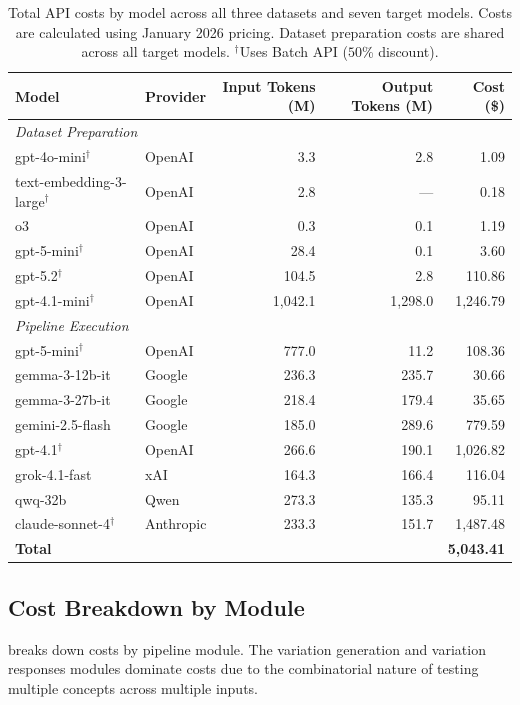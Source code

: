 \begin{table}[h]
\centering
\small
\caption{Total API costs by model across all three datasets and seven target models. Costs are calculated using January 2026 pricing. Dataset preparation costs are shared across all target models. $^\dagger$Uses Batch API ($50$\% discount).}
\label{tab:cost-by-model}
\begin{tabular}{llrrr}
\toprule
\textbf{Model} & \textbf{Provider} & \textbf{Input Tokens (M)} & \textbf{Output Tokens (M)} & \textbf{Cost (\$)} \\
\midrule
\multicolumn{5}{l}{\textit{Dataset Preparation}} \\
gpt-4o-mini$^\dagger$ & OpenAI & 3.3 & 2.8 & 1.09 \\
text-embedding-3-large$^\dagger$ & OpenAI & 2.8 & --- & 0.18 \\
o3 & OpenAI & 0.3 & 0.1 & 1.19 \\
gpt-5-mini$^\dagger$ & OpenAI & 28.4 & 0.1 & 3.60 \\
gpt-5.2$^\dagger$ & OpenAI & 104.5 & 2.8 & 110.86 \\
gpt-4.1-mini$^\dagger$ & OpenAI & 1{,}042.1 & 1{,}298.0 & 1{,}246.79 \\
\midrule
\multicolumn{5}{l}{\textit{Pipeline Execution}} \\
gpt-5-mini$^\dagger$ & OpenAI & 777.0 & 11.2 & 108.36 \\
gemma-3-12b-it & Google & 236.3 & 235.7 & 30.66 \\
gemma-3-27b-it & Google & 218.4 & 179.4 & 35.65 \\
gemini-2.5-flash & Google & 185.0 & 289.6 & 779.59 \\
gpt-4.1$^\dagger$ & OpenAI & 266.6 & 190.1 & 1{,}026.82 \\
grok-4.1-fast & xAI & 164.3 & 166.4 & 116.04 \\
qwq-32b & Qwen & 273.3 & 135.3 & 95.11 \\
claude-sonnet-4$^\dagger$ & Anthropic & 233.3 & 151.7 & 1{,}487.48 \\
\midrule
\textbf{Total} & & & & \textbf{5{,}043.41} \\
\bottomrule
\end{tabular}
\end{table}

\subsection{Cost Breakdown by Module}

 breaks down costs by pipeline module. The variation generation and variation responses modules dominate costs due to the combinatorial nature of testing multiple concepts across multiple inputs.


